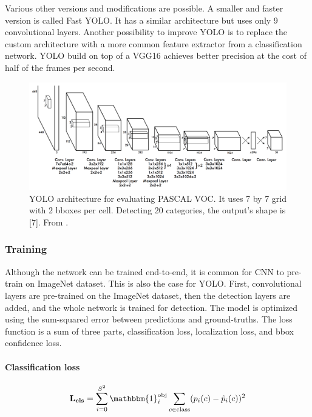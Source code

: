 Various other versions and modifications are possible. A smaller and faster version is called Fast YOLO. It has a similar architecture but uses only 9 convolutional layers. Another possibility to improve YOLO is to replace the custom architecture with a more common feature extractor from a classification network. YOLO build on top of a VGG16 achieves better precision at the cost of half of the frames per second.

\begin{figure}
    \centering
    \includegraphics[width=\textwidth]{img/yoylo}
    \caption[YOLO architecture]%
    {YOLO architecture for evaluating PASCAL VOC. It uses 7 by 7 grid with 2 bboxes per cell. Detecting 20 categories, the output's shape is [7]. From \cite[fig. 3]{bib:yolo}.}
    \label{fig:yolo} 
\end{figure}

\subsubsection{Training}
Although the network can be trained end-to-end, it is common for CNN to pre-train on ImageNet dataset. This is also the case for YOLO. First, convolutional layers are pre-trained on the ImageNet dataset, then the detection layers are added, and the whole network is trained for detection. The model is optimized using the sum-squared error between predictions and ground-truths. The loss function is a sum of three parts, classification loss, localization loss, and bbox confidence loss. 

\paragraph{Classification loss}
\begin{align*}
\mathbf{L_{cls}} = \sum_{i=0}^{S^2}\mathbbm{1}_i^{\text{obj}} \sum_{c\in \text{class}} (p_i(c) - \hat{p}_i(c))^2
\end{align*}


